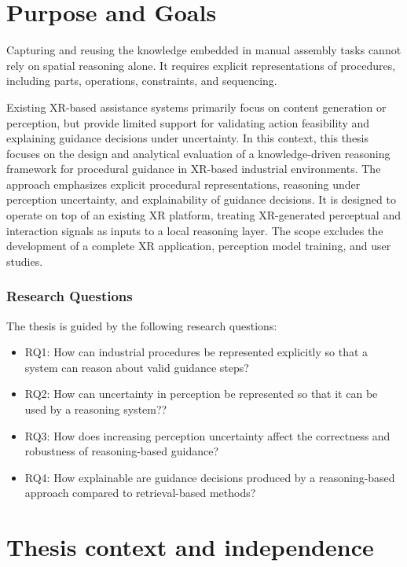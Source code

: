 \documentclass[11pt,titlepage,openright]{book}
\begin{document}
\section{Purpose and Goals}
\label{sec:purpose-goals}

Capturing and reusing the knowledge embedded in manual assembly tasks cannot rely on spatial reasoning alone. It requires explicit representations of procedures, including parts, operations, constraints, and sequencing.

Existing XR-based assistance systems primarily focus on content generation or perception, but provide limited support for validating action feasibility and explaining guidance decisions under uncertainty. In this context, this thesis focuses on the design and analytical evaluation of a knowledge-driven reasoning framework for procedural guidance in XR-based industrial environments. The approach emphasizes explicit procedural representations, reasoning under perception uncertainty, and explainability of guidance decisions. It is designed to operate on top of an existing XR platform, treating XR-generated perceptual and interaction signals as inputs to a local reasoning layer.
The scope excludes the development of a complete XR application, perception model training, and user studies.

\subsubsection{Research Questions}
The thesis is guided by the following research questions:

\begin{itemize}
\item RQ1: How can industrial procedures be represented explicitly so that a system can reason about valid guidance steps?
\item RQ2: How can uncertainty in perception be represented so that it can be used by a reasoning system??
\item RQ3: How does increasing perception uncertainty affect the correctness and robustness of reasoning-based guidance?
\item RQ4: How explainable are guidance decisions produced by a reasoning-based approach compared to retrieval-based methods?
\end{itemize}

\section{Thesis context and independence}
\label{sec:thesis-context}
\end{document}
